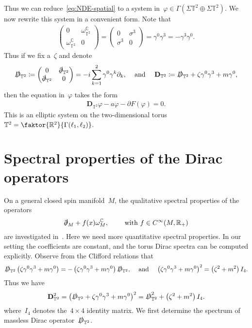\documentclass[10pt,a4paper]{amsart}
\newcommand{\p}{\partial}
\newcommand{\R}{\mathbb{R}}
\newcommand{\C}{\mathbb{C}}
\newcommand{\T}{\mathbb{T}}
\newcommand{\D}{\slashed{D}}
\newcommand{\pd}{\slashed{\partial}}
\newcommand{\pD}{\mathbf{D}}
\newcommand{\parenthesis}[1]{\left(#1\right)} %
\begin{document}
Thus we can reduce~\eqref{eq:NDE-spatial} to a system in~$\varphi\in\Gamma(\Sigma\T^2\oplus \Sigma\T^2)$. 
We now rewrite this system in a convenient form. 
Note that 
\begin{align}
    \begin{pmatrix} 0 & \omega_{\T^2}^{\C} \\ \omega_{\T^2}^{\C} & 0 \end{pmatrix} 
    =
    \begin{pmatrix} 0 & \sigma^3 \\ \sigma^3 & 0 \end{pmatrix}
    = \gamma^0 \gamma^3  = -\gamma^3\gamma^0.
\end{align}
Thus if we fix a~$\zeta$ and denote
\begin{align}\label{eq:Dirac-operators}
    \D_{\T^2}
    \coloneqq \begin{pmatrix}  0 & \pd_{\T^2} \\ \pd_{\T^2} & 0 \end{pmatrix}= -i\sum_{k=1}^2 \gamma^0\gamma^k\p_k, 
    & & \mbox{ and } & & 
    \pD_{\T^2} \coloneqq \D_{\T^2}+\zeta\gamma^0\gamma^3+m\gamma^0, 
\end{align}
then the equation in~$\varphi$ takes the form
\begin{align}\label{eq:NDE-T2}
    \pD_{\T^2}\varphi- a\varphi -\p F(\varphi)=0. 
\end{align}
This is an elliptic system on the two-dimensional torus~$\T^2= \faktor{\R^2}{\Gamma(\ell_1,\ell_2)}$. 


\section{Spectral properties of the Dirac operators}\label{sect:spectral}

On a general closed spin manifold~$M$, the qualitative spectral properties of the operators 
\begin{align}
    \pd_M + f(x)\omega^{\C}_M, \qquad \mbox{ with } f\in C^\infty(M, \R_+)
\end{align}
are investigated in~\cite{SireXu2023variational}. 
Here we need more quantitative spectral properties. 
In our setting the coefficients are constant, and the torus Dirac spectra can be computed explicitly. 
Observe from the Clifford relations that
    \begin{align}
        \D_{\T^2}\parenthesis{\zeta\gamma^0\gamma^3+m\gamma^0}
        = -\parenthesis{\zeta\gamma^0\gamma^3+m\gamma^0} \D_{\T^2}, 
        & & 
        \mbox{ and } 
        & & 
        \parenthesis{\zeta\gamma^0\gamma^3+m\gamma^0}^2
        =\parenthesis{\zeta^2+m^2}I_4.
    \end{align}
Thus we have
\begin{align}
    \pD_{\T^2}^2
    =\parenthesis{ \D_{\T^2} + \zeta \gamma^0\gamma^3 + m\gamma^0}^2 
    =\D_{\T^2}^2 + \parenthesis{\zeta^2+m^2}I_4.
\end{align}
where~$I_4$ denotes the~$4\times 4$ identity matrix.
We first determine the spectrum of massless Dirac operator~$\D_{\T^2}$. 
\end{document}
